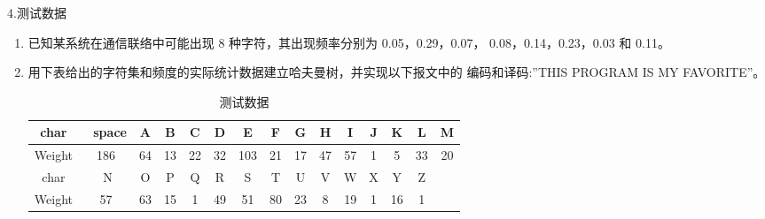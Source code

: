 \documentclass[paper=a4, fontsize=11pt]{scrartcl} %
\numberwithin{equation}{section} %
\numberwithin{figure}{section} %
\numberwithin{table}{section} %
\begin{document}
4.测试数据
\begin{enumerate}
    \item  已知某系统在通信联络中可能出现 8 种字符，其出现频率分别为 0.05，0.29，0.07， 0.08，0.14，0.23，0.03 和 0.11。
    \item 用下表给出的字符集和频度的实际统计数据建立哈夫曼树，并实现以下报文中的 编码和译码:”THIS PROGRAM IS MY FAVORITE”。
    \begin{table}[ht]
        \caption{测试数据}
        \centering
        \begin{tabular}{|c c c c c c c c c c c c c c c|}
            \hline
            char & space & A & B & C & D & E & F & G & H & I & J & K & L & M \\
            \hline
            Weight & 186 & 64 & 13 & 22 & 32 & 103 & 21 & 17 & 47 & 57 & 1 & 5 & 33 & 20\\
            \hline
            char & N & O & P & Q & R & S & T & U & V & W & X & Y & Z& & \\
            \hline
            Weight & 57 & 63 & 15 & 1 & 49 & 51 & 80 & 23 & 8 & 19 & 1 & 16 & 1\\
            \hline
        \end{tabular}
    \end{table}
\end{enumerate}











\end{document}
